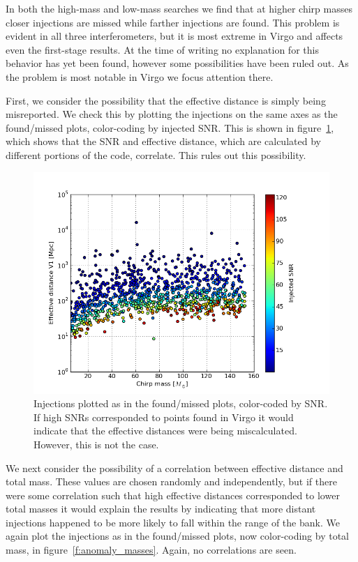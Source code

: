 In both the high-mass and low-mass searches we find that at higher
chirp masses closer injections are missed while farther injections are
found.  This problem is evident in all three interferometers, but it
is most extreme in Virgo and affects even the first-stage results.  At
the time of writing no explanation for this behavior has yet been
found, however some possibilities have been ruled out.  As the problem
is most notable in Virgo we focus attention there.

First, we consider the possibility that the effective distance is
simply being misreported.  We check this by plotting the injections on
the same axes as the found/missed plots, color-coding by injected SNR.
This is shown in figure~\ref{f:anomaly_snrs}, which shows that the SNR
and effective distance, which are calculated by different portions of
the code, correlate.  This rules out this possibility.

\begin{figure}
  \includegraphics[width=\linewidth]{figures/ninja2_results/anomaly_snrs}
  \caption[Injections color-coded by SNR]{
  \label{f:anomaly_snrs}
Injections plotted as in the found/missed plots, color-coded by SNR.
If high SNRs corresponded to points found in Virgo it would indicate
that the effective distances were being miscalculated.  However, this
is not the case.
}
\end{figure}%

We next consider the possibility of a correlation between effective
distance and total mass.  These values are chosen randomly and
independently, but if there were some correlation such that high
effective distances corresponded to lower total masses it would
explain the results by indicating that more distant injections
happened to be more likely to fall within the range of the bank.
We again plot the injections as in the found/missed plots, now
color-coding by total mass, in figure~\ref{f:anomaly_masses}.  Again,
no correlations are seen.


